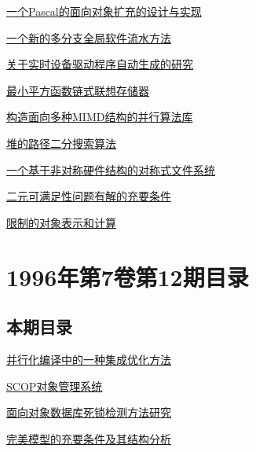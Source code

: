 \documentclass[a4paper]{article}
\begin{document}
\href{http://www.jos.org.cn/ch/reader/download_pdf.aspx?file_no=19960102&year_id=1996&quarter_id=1&falg=1}{一个Pascal的面向对象扩充的设计与实现}

\href{http://www.jos.org.cn/ch/reader/download_pdf.aspx?file_no=19960103&year_id=1996&quarter_id=1&falg=1}{一个新的多分支全局软件流水方法}

\href{http://www.jos.org.cn/ch/reader/download_pdf.aspx?file_no=19960104&year_id=1996&quarter_id=1&falg=1}{关于实时设备驱动程序自动生成的研究}

\href{http://www.jos.org.cn/ch/reader/download_pdf.aspx?file_no=19960105&year_id=1996&quarter_id=1&falg=1}{最小平方函数链式联想存储器}

\href{http://www.jos.org.cn/ch/reader/download_pdf.aspx?file_no=19960106&year_id=1996&quarter_id=1&falg=1}{构造面向多种MIMD结构的并行算法库}

\href{http://www.jos.org.cn/ch/reader/download_pdf.aspx?file_no=19960107&year_id=1996&quarter_id=1&falg=1}{堆的路径二分搜索算法}

\href{http://www.jos.org.cn/ch/reader/download_pdf.aspx?file_no=19960108&year_id=1996&quarter_id=1&falg=1}{一个基于非对称硬件结构的对称式文件系统}

\href{http://www.jos.org.cn/ch/reader/download_pdf.aspx?file_no=19960109&year_id=1996&quarter_id=1&falg=1}{二元可满足性问题有解的充要条件}

\href{http://www.jos.org.cn/ch/reader/download_pdf.aspx?file_no=19960110&year_id=1996&quarter_id=1&falg=1}{限制的对象表示和计算}


\section{\textbf{1996年第7卷第12期目录}}
\subsection{本期目录}
\href{http://www.jos.org.cn/ch/reader/download_pdf.aspx?file_no=19961201&year_id=1996&quarter_id=12&falg=1}{并行化编译中的一种集成优化方法}

\href{http://www.jos.org.cn/ch/reader/download_pdf.aspx?file_no=19961202&year_id=1996&quarter_id=12&falg=1}{SCOP对象管理系统}

\href{http://www.jos.org.cn/ch/reader/download_pdf.aspx?file_no=19961203&year_id=1996&quarter_id=12&falg=1}{面向对象数据库死锁检测方法研究}

\href{http://www.jos.org.cn/ch/reader/download_pdf.aspx?file_no=19961204&year_id=1996&quarter_id=12&falg=1}{完美模型的充要条件及其结构分析}
\end{document}
